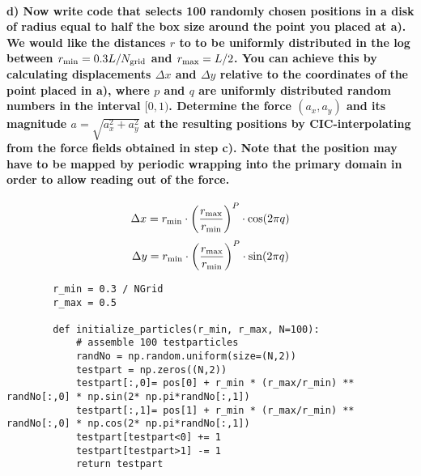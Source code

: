 \paragraph{d) Now write code that selects 100 randomly chosen positions in a 
    disk of radius equal to half the box size around the point you placed at 
    a). We would like the distances $r$ to to be uniformly distributed in the 
    log between $r_\textnormal{min}=0.3L/N_\textnormal{grid}$ and 
    $r_\textnormal{max}=L/2$. You can achieve this by calculating 
    displacements $\Delta x$ and $\Delta y$ relative to the coordinates of the 
    point placed in a), where $p$ and $q$ are uniformly distributed random 
    numbers in the interval $[0,1)$. Determine the force $(a_x,a_y)$ and its 
    magnitude $a=\sqrt{a_x^2+a_y^2}$ at the resulting positions by 
    CIC-interpolating from the force fields obtained in step c). Note that 
    the position may have to be mapped by periodic wrapping into the primary 
    domain in order to allow reading out of the force.
}
    \begin{equation}
        \Delta x=
        r_\textnormal{min}\cdot\bigg(
            \frac{r_\textnormal{max}}{r_\textnormal{min}}
        \bigg)^P\cdot\cos(2\pi q)
    \end{equation}
    \begin{equation}
        \Delta y=
        r_\textnormal{min}\cdot\bigg(
            \frac{r_\textnormal{max}}{r_\textnormal{min}}
        \bigg)^P\cdot\sin(2\pi q)
    \end{equation}
    \begin{lstlisting}
        r_min = 0.3 / NGrid
        r_max = 0.5

        def initialize_particles(r_min, r_max, N=100):
            # assemble 100 testparticles
            randNo = np.random.uniform(size=(N,2))
            testpart = np.zeros((N,2))
            testpart[:,0]= pos[0] + r_min * (r_max/r_min) ** randNo[:,0] * np.sin(2* np.pi*randNo[:,1])
            testpart[:,1]= pos[1] + r_min * (r_max/r_min) ** randNo[:,0] * np.cos(2* np.pi*randNo[:,1])
            testpart[testpart<0] += 1
            testpart[testpart>1] -= 1
            return testpart\end{lstlisting}


